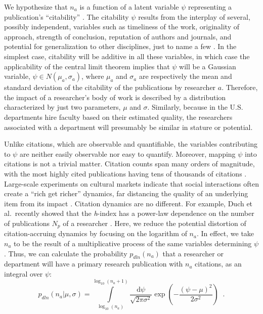 We hypothesize that $n_a$ is a function of a latent variable $\psi$ representing a publication's ``citability'' \cite{Burrell2001}. The citability $\psi$ results from the interplay of several, possibly independent, variables such as timeliness of the work, originality of approach, strength of conclusion, reputation of authors and journals, and potential for generalization to other disciplines, just to name a few \cite{Shockley1957, Letchford2015}. In the simplest case, citability will be additive in all these variables, in which case the applicability of the central limit theorem implies that $\psi$ will be a Gaussian variable, $\psi \in N(\mu_a, \sigma_a)$, where $\mu_a$ and $\sigma_a$ are respectively the mean and standard deviation of the citability of the publications by researcher $a$. Therefore, the impact of a researcher's body of work is described by a distribution characterized by just two parameters, $\mu$ and $\sigma$. Similarly, because in the U.S. departments hire faculty based on their estimated quality, the researchers associated with a department will presumably be similar in stature or potential.

Unlike citations, which are observable and quantifiable, the variables contributing to $\psi$ are neither easily observable nor easy to quantify. Moreover, mapping $\psi$ into citations is not a trivial matter. Citation counts span many orders of magnitude, with the most highly cited publications having tens of thousands of citations \cite{VanNoorden2014}. Large-scale experiments on cultural markets indicate that social interactions often create a ``rich get richer'' dynamics, far distancing the quality of an underlying item from its impact \cite{Salganik2006}. Citation dynamics are no different. For example, Duch et al.\ recently showed that the \emph{h}-index has a power-law dependence on the number of publications $N_p$ of a researcher \cite{Duch2012}. Here, we reduce the potential distortion of citation-accruing dynamics by focusing on the logarithm of $n_a$. In effect, we take $n_a$ to be the result of a multiplicative process of the same variables determining $\psi$. Thus, we can calculate the probability $p_{dln}(n_a)$ that a researcher or department will have a primary research publication with $n_a$ citations, as an integral over $\psi$:
\begin{equation}\label{eq:lognorm-eq}
p_{dln}(n_a|\mu,\sigma) = \int\limits_{\log_{10}(n_a)}^{\log_{10}(n_a+1)}\frac{\mathrm{d}\psi}{\sqrt{2\pi\sigma^2}}\exp{\left(-\frac{(\psi-\mu)^2}{2\sigma^2}\right)}\;\;.
\end{equation}

